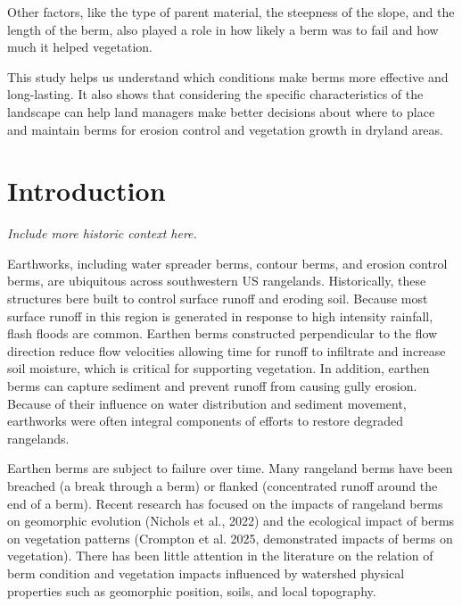 \documentclass[review]{elsarticle}
\begin{document}
Other factors, like the type of parent material, the steepness of the slope, and the length of the berm, also played a role in how likely a berm was to fail and how much it helped vegetation. 

This study helps us understand which conditions make berms more effective and long-lasting. It also shows that considering the specific characteristics of the landscape can help land managers make better decisions about where to place and maintain berms for erosion control and vegetation growth in dryland areas.

\section{Introduction}

\textit{Include more historic context here.}

Earthworks, including water spreader berms, contour berms, and erosion control berms, are ubiquitous across southwestern US rangelands.
Historically, these structures bere built to control surface runoff and eroding soil. Because most surface runoff in this region is generated in response to high intensity rainfall, flash floods are common. Earthen berms constructed perpendicular to the flow direction reduce flow velocities allowing time for runoff to infiltrate and increase soil moisture, which is critical for supporting vegetation. In addition, earthen berms can capture sediment and prevent runoff from causing gully erosion. 
Because of their influence on water distribution and sediment movement, earthworks were often integral components of efforts to restore degraded rangelands.

Earthen berms are subject to failure over time. 
 Many rangeland berms have been breached (a break through a berm) or flanked (concentrated runoff around the end of a berm).
  Recent research has focused on the impacts of rangeland berms on geomorphic evolution (Nichols et al., 2022) and the ecological impact of berms on vegetation patterns (Crompton et al. 2025, demonstrated impacts of berms on vegetation).  
  There has been little attention in the literature on the relation of berm condition and vegetation impacts influenced by watershed physical properties such as geomorphic position, soils, and local topography.
\end{document}
